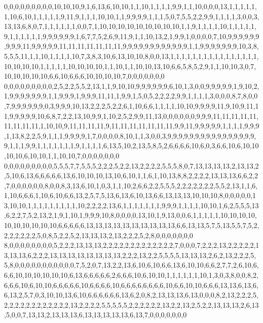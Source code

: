 0,0,0,0,0,0,0,0,0,10,10,10,9,1,6,13,6,10,10,1,1,10,1,1,1,1,9,9,1,1,10,0,0,0,13,1,1,1,1,1,1,10,6,10,1,1,1,1,1,9,11,9,1,1,1,10,10,1,1,9,9,9,9,1,1,1,5,0,7,5,5,2,2,9,9,1,1,1,1,3,0,0,3,13,13,6,8,0,7,1,1,1,1,1,1,0,0,7,1,10,10,10,10,10,10,10,10,10,1,1,9,1,1,1,1,10,1,1,1,1,1,9,1,1,1,1,1,1,9,9,9,9,9,9,1,6,7,7,5,2,6,9,11,9,1,1,10,13,2,1,9,9,1,0,0,0,0,7,10,9,9,9,9,9,9,9,9,9,11,9,9,9,9,9,11,11,11,11,11,11,11,9,9,9,9,9,9,9,9,9,9,9,9,1,1,9,9,9,9,9,9,9,10,3,8,5,5,5,11,1,1,10,1,1,1,1,10,7,3,8,3,10,6,13,10,10,8,0,0,13,1,1,1,1,1,1,1,1,1,1,1,1,1,1,1,1,10,10,10,10,1,1,1,1,1,10,10,10,10,1,1,10,1,1,10,10,13,10,6,6,5,8,5,2,9,1,1,10,10,3,0,7,10,10,10,10,10,6,6,10,6,6,6,10,10,10,10,7,0,0,0,0,0,0,0
0,0,0,0,0,0,0,0,0,2,5,2,2,5,5,2,13,1,1,9,10,10,9,9,9,9,9,9,6,10,1,3,0,0,9,9,9,9,9,1,9,10,2,1,9,9,9,9,9,9,9,1,1,9,9,9,1,9,9,9,11,11,1,9,9,1,5,0,5,2,2,2,2,9,9,1,1,1,1,3,0,0,0,8,7,8,0,0,7,9,9,9,9,9,9,0,3,9,9,9,10,13,2,2,2,5,2,2,6,1,10,6,6,1,1,1,1,10,10,9,9,9,9,11,9,10,9,11,11,9,9,9,9,9,10,6,8,7,2,2,13,10,9,9,1,10,2,5,2,9,9,11,13,0,0,0,0,0,0,9,9,9,11,11,11,11,11,11,11,11,11,1,10,10,9,11,11,11,11,9,11,11,11,11,11,11,11,9,9,11,9,9,9,9,9,1,1,1,1,9,9,9,1,13,8,2,2,5,9,1,1,1,9,9,9,9,1,7,0,0,0,0,8,10,1,1,3,0,0,3,9,9,9,9,9,9,9,9,9,9,9,9,9,9,9,9,9,1,1,1,9,9,1,1,1,1,1,1,1,9,1,1,1,1,6,13,5,10,2,13,5,8,5,2,6,6,6,6,10,6,0,3,6,6,10,6,10,10,10,10,6,10,10,1,1,10,10,7,0,0,0,0,0,0,0
0,0,0,0,0,0,0,0,0,5,5,5,7,7,5,5,5,2,2,2,5,2,2,13,2,2,2,2,5,5,5,8,0,7,13,13,13,13,2,13,13,2,5,10,6,13,6,6,6,6,6,13,6,10,10,10,13,10,6,10,1,1,6,1,10,13,8,8,2,2,2,2,13,13,13,6,6,2,2,7,0,0,0,0,0,0,8,0,0,8,3,13,6,10,1,0,3,1,1,10,2,6,6,2,2,5,5,5,2,2,2,2,2,2,2,5,5,2,13,1,1,6,1,10,6,6,6,1,10,6,10,6,6,13,2,5,7,5,13,6,13,6,10,13,6,6,13,13,13,10,10,10,8,0,0,0,0,0,13,10,10,1,1,1,1,1,1,1,1,1,10,2,2,2,2,13,6,1,1,1,1,1,1,1,9,9,9,1,1,1,1,10,10,1,6,2,5,5,5,13,6,2,2,7,5,2,13,2,1,9,1,10,1,9,9,9,10,8,0,0,0,0,13,10,1,9,13,0,0,6,1,1,1,1,1,10,10,10,10,10,10,10,10,10,10,6,6,6,6,6,13,13,13,13,13,13,13,13,13,13,6,6,13,13,5,7,5,13,5,5,7,5,2,2,2,2,2,2,2,5,0,8,5,2,2,5,2,13,13,13,2,13,2,2,2,5,2,8,0,0,0,0,0,0,0
8,0,0,0,0,0,0,0,0,5,2,2,2,13,13,13,2,2,2,2,2,2,2,2,2,2,2,2,2,7,0,0,0,7,2,2,2,13,2,2,2,2,2,13,13,13,6,2,2,2,13,13,13,13,13,13,13,13,2,2,2,13,2,2,5,5,5,5,13,13,13,2,6,2,13,2,2,2,5,5,8,0,0,0,0,0,0,0,0,0,0,0,7,5,2,0,7,13,2,2,13,6,10,6,10,6,6,13,6,10,10,6,6,2,7,7,2,6,10,6,6,6,10,10,10,10,10,10,6,13,6,6,6,6,6,2,6,6,6,10,6,10,10,1,1,1,1,1,1,10,1,3,0,3,8,0,0,8,2,6,6,6,10,6,10,10,6,6,6,6,6,10,6,6,6,6,10,6,6,6,6,6,6,6,6,10,6,6,10,10,6,6,6,13,13,6,13,6,6,13,2,5,7,0,3,10,10,13,6,10,6,6,6,6,6,6,13,6,2,0,8,2,13,13,13,6,13,0,0,0,8,2,13,2,2,2,5,2,2,2,2,2,2,2,2,2,2,2,2,13,2,2,2,2,5,5,5,5,5,2,2,2,2,2,2,13,2,2,13,2,5,2,2,13,13,13,2,6,13,5,0,0,7,13,13,2,13,13,13,6,13,13,13,13,13,6,13,7,0,0,0,0,0,0,0

